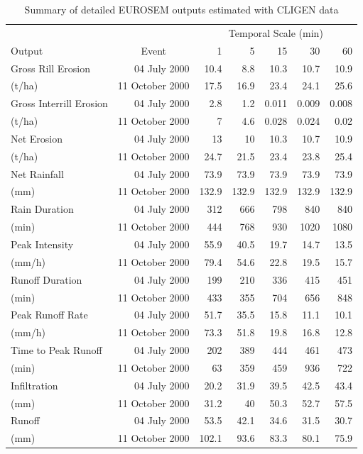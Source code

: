 \begin{table}[htb]
\footnotesize
\caption{Summary of detailed EUROSEM outputs estimated with CLIGEN data}
\begin{center}
\begin{tabular}{lrrrrrr}
\toprule
\multicolumn{1}{l}{} & \multicolumn{1}{l}{} & \multicolumn{5}{c}{Temporal Scale
(min)} \\ \cmidrule{3-7}
\multicolumn{1}{l}{Output} & \multicolumn{1}{c}{Event} & 1 & 5 & 15 & 30 & 60 \\
\midrule
Gross Rill Erosion & 04 July 2000 & 10.4 & 8.8 & 10.3 & 10.7 & 10.9 \\
(t/ha) & 11 October 2000 & 17.5 & 16.9 & 23.4 & 24.1 & 25.6 \\ \midrule
Gross Interrill Erosion & 04 July 2000 & 2.8 & 1.2 & 0.011 & 0.009 & 0.008 \\
(t/ha) & 11 October 2000 & 7 & 4.6 & 0.028 & 0.024 & 0.02 \\ \midrule
Net Erosion & 04 July 2000 & 13 & 10 & 10.3 & 10.7 & 10.9 \\
(t/ha) & 11 October 2000 & 24.7 & 21.5 & 23.4 & 23.8 & 25.4 \\ \midrule
Net Rainfall & 04 July 2000 & 73.9 & 73.9 & 73.9 & 73.9 & 73.9 \\
(mm) & 11 October 2000 & 132.9 & 132.9 & 132.9 & 132.9 & 132.9 \\ \midrule
Rain Duration & 04 July 2000 & 312 & 666 & 798 & 840 & 840 \\
(min) & 11 October 2000 & 444 & 768 & 930 & 1020 & 1080 \\ \midrule
Peak Intensity & 04 July 2000 & 55.9 & 40.5 & 19.7 & 14.7 & 13.5 \\
(mm/h) & 11 October 2000 & 79.4 & 54.6 & 22.8 & 19.5 & 15.7 \\ \midrule
Runoff Duration & 04 July 2000 & 199 & 210 & 336 & 415 & 451 \\
(min) & 11 October 2000 & 433 & 355 & 704 & 656 & 848 \\ \midrule
Peak Runoff Rate & 04 July 2000 & 51.7 & 35.5 & 15.8 & 11.1 & 10.1 \\
(mm/h) & 11 October 2000 & 73.3 & 51.8 & 19.8 & 16.8 & 12.8 \\ \midrule
Time to Peak Runoff & 04 July 2000 & 202 & 389 & 444 & 461 & 473 \\
(min) & 11 October 2000 & 63 & 359 & 459 & 936 & 722 \\ \midrule
Infiltration & 04 July 2000 & 20.2 & 31.9 & 39.5 & 42.5 & 43.4 \\
(mm) & 11 October 2000 & 31.2 & 40 & 50.3 & 52.7 & 57.5 \\ \midrule
Runoff & 04 July 2000 & 53.5 & 42.1 & 34.6 & 31.5 & 30.7 \\
(mm) & 11 October 2000 & 102.1 & 93.6 & 83.3 & 80.1 & 75.9 \\ \bottomrule
\end{tabular}
\end{center}
\label{tab:eurosemscaleresultdetails}
\end{table}


